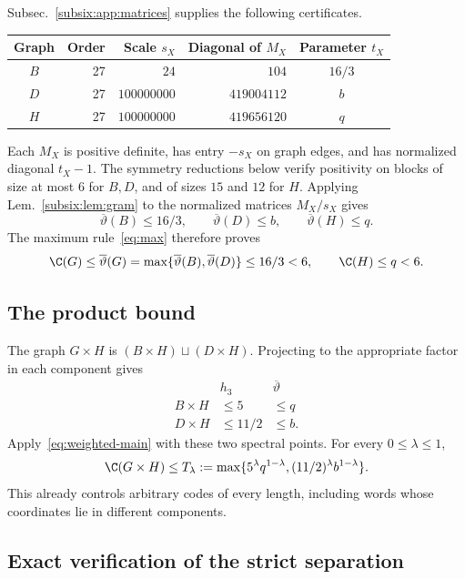 Subsec.~\ref{subsix:app:matrices} supplies the following certificates.
\begin{center}
\begin{tabular}{c r r r c}
\toprule
Graph&Order&Scale $s_X$&Diagonal of $M_X$&Parameter $t_X$\\
\midrule
$B$&27&$24$&$104$&$16/3$\\
$D$&27&$100000000$&$419004112$&$b$\\
$H$&27&$100000000$&$419656120$&$q$\\
\bottomrule
\end{tabular}
\end{center}
Each $M_X$ is positive definite, has entry $-s_X$ on graph edges,
and has normalized diagonal $t_X-1$. The symmetry reductions below
verify positivity on blocks of size at most $6$ for $B,D$, and of sizes
$15$ and $12$ for $H$. Applying Lem.~\ref{subsix:lem:gram} to the
normalized matrices $M_X/s_X$ gives
\[
 \overline\vartheta(B)\le16/3,\qquad
 \overline\vartheta(D)\le b,\qquad
 \overline\vartheta(H)\le q.
\]
The maximum rule~\eqref{eq:max} therefore proves
\begin{equation}\label{subsix:eq:factoruppers}
 \C(G)\le\overline\vartheta(G)
 =\max\{\overline\vartheta(B),\overline\vartheta(D)\}\le16/3<6,
 \qquad \C(H)\le q<6.
\end{equation}

\subsection{The product bound}\label{subsix:sec:weighted}

The graph $G\times H$ is $(B\times H)\sqcup(D\times H)$.
Projecting to the appropriate factor in each component gives
\[
\begin{array}{c|cc}
 &h_3&\overline\vartheta\\ \hline
 B\times H&\le5&\le q\\
 D\times H&\le11/2&\le b .
\end{array}
\]
Apply~\eqref{eq:weighted-main} with these two spectral points. For every
$0\le\lambda\le1$,
\begin{equation}\label{subsix:eq:productupper}
 \C(G\times H)\le T_\lambda
 :=\max\{5^\lambda q^{1-\lambda},(11/2)^\lambda b^{1-\lambda}\}.
\end{equation}
This already controls arbitrary codes of every length, including words
whose coordinates lie in different components.

\subsection{Exact verification of the strict separation}

